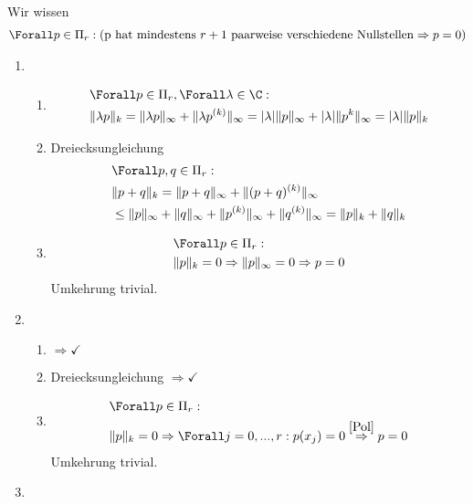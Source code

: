 \begin{solution}
Wir wissen
\begin{align}\label{Pol}
  \Forall p \in \Pi_r :(\text{p hat mindestens $r+1$ paarweise verschiedene Nullstellen} \Rightarrow p = 0)
\end{align}
\begin{enumerate}[label = \textbf{\alph*)}]
  \item
  \begin{enumerate}[label = \textit{\roman*)}]
    \item {} \begin{align*}
      & \Forall p \in \Pi_r, \Forall \lambda \in \C: \\
      & \|\lambda p\|_k = \|\lambda p\|_\infty + \|\lambda p^{(k)}\|_\infty = |\lambda| \|p\|_\infty + |\lambda| \|p^{k}\|_\infty = |\lambda| \|p\|_k
    \end{align*}
    \item Dreiecksungleichung \begin{align*}
      &\Forall p,q \in \Pi_r: \\
      & \|p+q\|_k = \|p+q\|_\infty + \|(p+q)^{(k)}\|_\infty \\
      &\leq \|p\|_\infty + \|q\|_\infty + \|p^{(k)}\|_\infty + \|q^{(k)}\|_\infty = \|p\|_k + \|q\|_k
    \end{align*}
    \item {} \begin{align*}
      &\Forall p \in \Pi_r: \\
      & \|p\|_k = 0 \Rightarrow \|p\|_\infty = 0 \Rightarrow p = 0
    \end{align*}
    Umkehrung trivial.
  \end{enumerate}
  \item
  \begin{enumerate}[label = \textit{\roman*)}]
    \item {} $\Rightarrow \checkmark$
    \item Dreiecksungleichung $\Rightarrow \checkmark$
    \item {} \begin{align*}
      &\Forall p \in \Pi_r: \\
      & \|p\|_k = 0 \Rightarrow \Forall j=0,...,r: p(x_j) = 0 \stackrel{\eqref{Pol}}{\Rightarrow} p = 0
    \end{align*}
    Umkehrung trivial.
  \end{enumerate}
  \item

\end{enumerate}
\end{solution}
